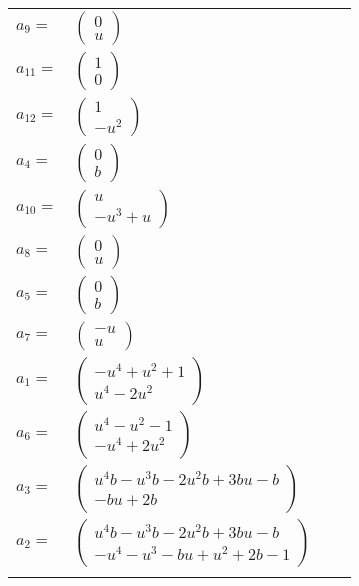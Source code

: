 \documentclass[1p]{elsarticle_modified}
\theoremstyle{definition}
\begin{document}
\begin{tabular}{m{7pt} m{180pt} m{7pt} m{180pt} }
\flushright $a_{9}=$&$\begin{pmatrix}0\\u\end{pmatrix}$ \\
\flushright $a_{11}=$&$\begin{pmatrix}1\\0\end{pmatrix}$ \\
\flushright $a_{12}=$&$\begin{pmatrix}1\\- u^2\end{pmatrix}$ \\
\flushright $a_{4}=$&$\begin{pmatrix}0\\b\end{pmatrix}$ \\
\flushright $a_{10}=$&$\begin{pmatrix}u\\- u^3+u\end{pmatrix}$ \\
\flushright $a_{8}=$&$\begin{pmatrix}0\\u\end{pmatrix}$ \\
\flushright $a_{5}=$&$\begin{pmatrix}0\\b\end{pmatrix}$ \\
\flushright $a_{7}=$&$\begin{pmatrix}- u\\u\end{pmatrix}$ \\
\flushright $a_{1}=$&$\begin{pmatrix}- u^4+u^2+1\\u^4-2 u^2\end{pmatrix}$ \\
\flushright $a_{6}=$&$\begin{pmatrix}u^4- u^2-1\\- u^4+2 u^2\end{pmatrix}$ \\
\flushright $a_{3}=$&$\begin{pmatrix}u^4 b- u^3 b-2 u^2 b+3 b u- b\\- b u+2 b\end{pmatrix}$ \\
\flushright $a_{2}=$&$\begin{pmatrix}u^4 b- u^3 b-2 u^2 b+3 b u- b\\- u^4- u^3- b u+u^2+2 b-1\end{pmatrix}$\\&\end{tabular}
\end{document}
